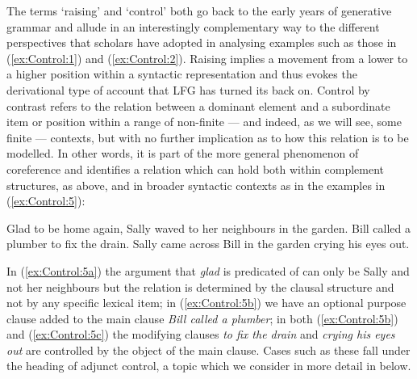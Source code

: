 \documentclass[output=paper,hidelinks]{langscibook}
\begin{document}
The terms `raising' and `control' both go back to the early years of generative grammar and allude in an interestingly complementary way to the different perspectives that scholars have adopted in analysing examples such as those in (\ref{ex:Control:1}) and (\ref{ex:Control:2}). Raising implies a movement from a lower to a higher position within a syntactic representation and thus evokes the derivational type of account that LFG has turned its back on. Control by contrast refers to the relation between a dominant element and a subordinate item or position within a range of non-finite --- and indeed, as we will see, some finite --- contexts, but with no further implication as to how this relation is to be modelled. In other words, it is part of the more general phenomenon of coreference and identifies a relation which can hold both within complement structures, as above, and in broader syntactic contexts as in the examples in (\ref{ex:Control:5}):

\ea\label{ex:Control:5}
\ea\label{ex:Control:5a} Glad to be home again, Sally waved to her neighbours in the garden.
\ex\label{ex:Control:5b} Bill called a plumber to fix the drain.
\ex\label{ex:Control:5c} Sally came across Bill in the garden crying his eyes out.
\z\z

In (\ref{ex:Control:5a}) the argument that \emph{glad} is predicated of can only be Sally and not her neighbours but the relation is determined by the clausal structure and not by any specific lexical item; in (\ref{ex:Control:5b}) we have an optional purpose clause added to the main clause \emph{Bill called a plumber}; in both (\ref{ex:Control:5b}) and (\ref{ex:Control:5c}) the modifying clauses \emph{to fix the drain} and \emph{crying his eyes out} are controlled by the object of the main clause. Cases such as these fall under the heading of adjunct control, a topic which we consider in more detail in  below.
\end{document}
